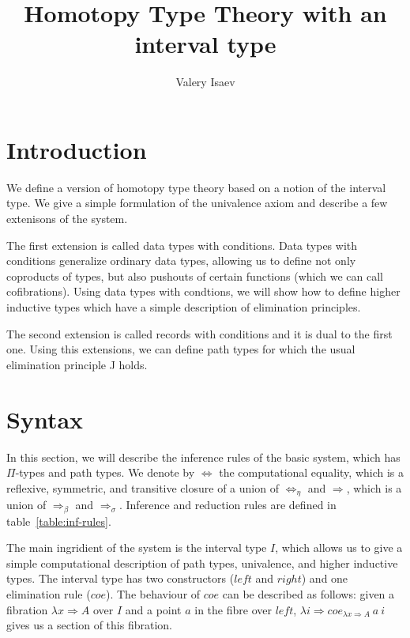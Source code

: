 \documentclass{amsart}
\theoremstyle{definition}
\theoremstyle{remark}
\newcommand{\red}{\Rightarrow}
\newcommand{\deq}{\Leftrightarrow}
\numberwithin{figure}{section}
\begin{document}
\title{Homotopy Type Theory with an interval type}

\author{Valery Isaev}


\maketitle

\section{Introduction}

We define a version of homotopy type theory based on a notion of the interval type.
We give a simple formulation of the univalence axiom and describe a few extenisons of the system.

The first extension is called data types with conditions.
Data types with conditions generalize ordinary data types, allowing us to define not only coproducts of types, but also pushouts of certain functions (which we can call cofibrations).
Using data types with condtions, we will show how to define higher inductive types which have a simple description of elimination principles.

The second extension is called records with conditions and it is dual to the first one.
Using this extensions, we can define path types for which the usual elimination principle J holds.

\section{Syntax}

In this section, we will describe the inference rules of the basic system, which has $\Pi$-types and path types.
We denote by $\deq$ the computational equality, which is a reflexive, symmetric, and transitive closure of a union of $\deq_\eta$ and $\red$, which is a union of $\red_\beta$ and $\red_\sigma$.
Inference and reduction rules are defined in table~\ref{table:inf-rules}.

The main ingridient of the system is the interval type $I$, which allows us to give a simple computational description of path types, univalence, and higher inductive types.
The interval type has two constructors ($left$ and $right$) and one elimination rule ($coe$).
The behaviour of $coe$ can be described as follows:
given a fibration $\lambda x \red A$ over $I$ and a point $a$ in the fibre over $left$, $\lambda i \red coe_{\lambda x \red A}\ a\ i$ gives us a section of this fibration.
\end{document}
